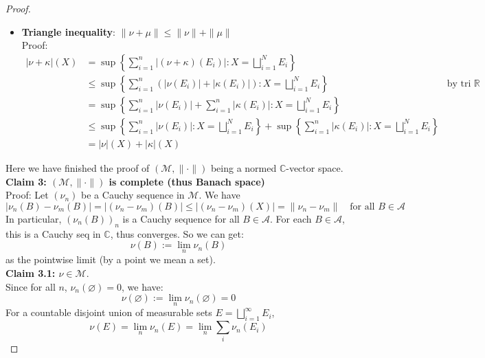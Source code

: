 \documentclass[lang=cn,11pt]{elegantbook}
\begin{document}
\begin{proof}
\begin{itemize}
Proof: \begin{align*}
 \| \alpha \nu \| := 
|\alpha \nu|(X) &=     \sup\{\sum_{j=1}^n|\alpha \nu(E_j)| :X=\bigsqcup_{j=1}^nE_j\} \\
&= |\alpha|\sup \{\sum_{j=1}^n| \nu(E_j)| :X=\bigsqcup_{j=1}^nE_j\}\\
& =|\alpha| |\nu | (X)  = |\alpha|\| \nu \|
\end{align*}
    \item \textbf{Triangle inequality}: $\|\nu+\mu\| \leq\|\nu\|+\|\mu\|$\\
Proof: 
\begin{align*}
    |\nu + \kappa|(X) &=\sup \left\{ \sum_{i=1}^n |(\nu + \kappa)(E_i)| 
 : X= \bigsqcup_{i=1}^N E_i \right\} \\
    & \leq \sup \left\{ \sum_{i=1}^n (|\nu(E_i)| +|\kappa(E_i)|)  
 : X= \bigsqcup_{i=1}^N E_i \right\} \quad &\text{by tri ineq in } \mathbb{R}           \\
 & =  \sup \left\{ \sum_{i=1}^n |\nu(E_i)| +  \sum_{i=1}^n|\kappa(E_i)|  
 : X= \bigsqcup_{i=1}^N E_i \right\}       \\
 &\leq \sup \left\{ \sum_{i=1}^n |\nu(E_i)| 
 : X= \bigsqcup_{i=1}^N E_i \right\} + \sup \left\{ \sum_{i=1}^n |\kappa(E_i)|
 : X= \bigsqcup_{i=1}^N E_i \right\}\\
 &= |\nu|(X)+|\kappa|(X) 
\end{align*}
\end{itemize}
Here we have finished the proof of $(\mathcal{M}, \| \cdot \|)$ being a normed $\mathbb{C}$-vector space.\\
\textbf{Claim 3: $(\mathcal{M}, \| \cdot \|)$ is complete (thus Banach space)}\\
Proof: 
Let $(\nu_n)$ be a Cauchy sequence in $\mathcal{M}$. We have
\[
|\nu_n(B) - \nu_m(B)| = |(\nu_n - \nu_m)(B)| \leq  |(\nu_n - \nu_m)(X)| =   \|\nu_n - \nu_m\| \quad \text{for all } B \in \mathcal{A}
\]
In particular, $(\nu_n(B))_n$ is a Cauchy sequence for all $B \in \mathcal{A}$. For each $B \in \mathcal{A}$, this is a Cauchy seq in $\mathbb{C}$, thus converges. So we can get: \[
\nu(B) := \lim_n \nu_n(B)
\]
as the pointwise limit (by a point we mean a set).\\
\textbf{Claim 3.1: $\nu \in \mathcal{M}$}.\\
Since for all $n$, $\nu_n(\varnothing) = 0$, we have:
\[
\nu(\varnothing) := \lim_n \nu_n(\varnothing) = 0
\]
For a countable disjoint union of measurable sets \(E = \bigsqcup_{i=1}^\infty E_i\), \[
  \nu(E) =  \lim_n   \nu_n(E) = \lim_n \sum_i \nu_n(E_i)
\]
\end{proof}
\end{document}
